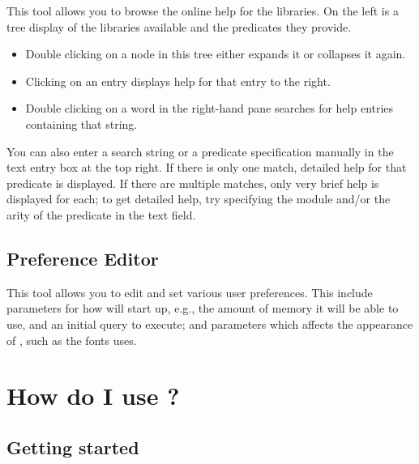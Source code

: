 This tool allows you to browse the online help for the {\eclipse} libraries.
On the left is a tree display of the libraries available and the predicates
they provide.
\begin{itemize}
\item Double clicking on a node in this tree either expands it or collapses it
again.
\item Clicking on an entry displays help for that entry to the right.
\item Double clicking on a word in the right-hand pane searches for help
entries containing that string.
\end{itemize}
You can also enter a search string or a predicate specification manually
in the text entry box at the top right.
If there is only one match, detailed help for that predicate is displayed.
If there are multiple matches, only very brief help is displayed for each;
to get detailed help, try specifying the module and/or the arity of the
predicate in the text field.

\subsection{Preference Editor}

This tool allows you to edit and set various user preferences. This include
parameters for how {\tkeclipse} will start up, e.g., the amount of memory it
will be able to use, and an initial query to execute; and parameters which
affects the appearance of {\tkeclipse}, such as the fonts {\tkeclipse}
uses.

\section{How do I use ?}

\subsection{Getting started}


